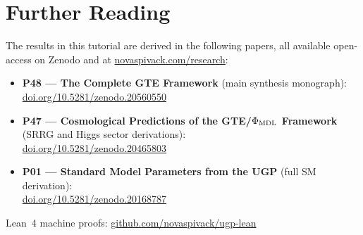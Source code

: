 \documentclass[11pt,a4paper]{article}
\begin{document}
\section*{Further Reading}
\begin{tcolorbox}[colback=orange!8,colframe=orange!50!black,
  title=\textbf{Primary Sources}]
The results in this tutorial are derived in the following papers,
all available open-access on Zenodo and at
\href{https://novaspivack.com/research}{novaspivack.com/research}:
\begin{itemize}[itemsep=2pt]
  \item \textbf{P48 --- The Complete GTE Framework} (main synthesis monograph):\\
        \href{https://doi.org/10.5281/zenodo.20560550}{doi.org/10.5281/zenodo.20560550}
  \item \textbf{P47 --- Cosmological Predictions of the GTE/$\Phi_{\rm MDL}$ Framework}
        (SRRG and Higgs sector derivations):\\
        \href{https://doi.org/10.5281/zenodo.20465803}{doi.org/10.5281/zenodo.20465803}
  \item \textbf{P01 --- Standard Model Parameters from the UGP} (full SM derivation):\\
        \href{https://doi.org/10.5281/zenodo.20168787}{doi.org/10.5281/zenodo.20168787}
\end{itemize}
Lean~4 machine proofs: \href{https://github.com/novaspivack/ugp-lean}{github.com/novaspivack/ugp-lean}
\end{tcolorbox}



\end{document}
